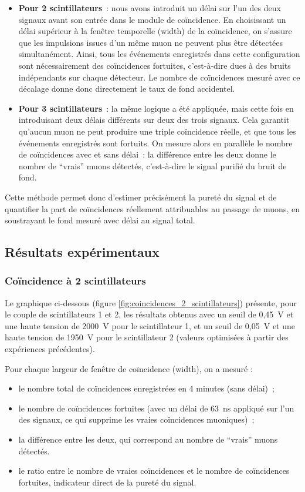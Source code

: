 \documentclass[a4paper,12pt,twoside]{article}
\begin{document}
\begin{itemize}
    \item \textbf{Pour 2 scintillateurs}~: nous avons introduit un délai sur l’un des deux signaux avant son entrée dans le module de coïncidence. En choisissant un délai supérieur à la fenêtre temporelle (width) de la coïncidence, on s’assure que les impulsions issues d’un même muon ne peuvent plus être détectées simultanément. Ainsi, tous les événements enregistrés dans cette configuration sont nécessairement des coïncidences fortuites, c’est-à-dire dues à des bruits indépendants sur chaque détecteur. Le nombre de coïncidences mesuré avec ce décalage donne donc directement le taux de fond accidentel.
    \item \textbf{Pour 3 scintillateurs}~: la même logique a été appliquée, mais cette fois en introduisant deux délais différents sur deux des trois signaux. Cela garantit qu’aucun muon ne peut produire une triple coïncidence réelle, et que tous les événements enregistrés sont fortuits. On mesure alors en parallèle le nombre de coïncidences avec et sans délai~: la différence entre les deux donne le nombre de “vrais” muons détectés, c’est-à-dire le signal purifié du bruit de fond.
\end{itemize}

Cette méthode permet donc d’estimer précisément la pureté du signal et de quantifier la part de coïncidences réellement attribuables au passage de muons, en soustrayant le fond mesuré avec délai au signal total.

\newpage

\subsection{Résultats expérimentaux}
\subsubsection{Coïncidence à 2 scintillateurs}

Le graphique ci-dessous (figure \ref{fig:coincidences_2_scintillateurs}) présente, pour le couple de scintillateurs 1 et 2, les résultats obtenus avec un seuil de 0{,}45~V et une haute tension de 2000~V pour le scintillateur 1, et un seuil de 0{,}05~V et une haute tension de 1950~V pour le scintillateur 2 (valeurs optimisées à partir des expériences précédentes).

Pour chaque largeur de fenêtre de coïncidence (width), on a mesuré :
\begin{itemize}
    \item le nombre total de coïncidences enregistrées en 4 minutes (sans délai)~;
    \item le nombre de coïncidences fortuites (avec un délai de 63~ns appliqué sur l’un des signaux, ce qui supprime les vraies coïncidences muoniques)~;
    \item la différence entre les deux, qui correspond au nombre de “vrais” muons détectés.
    \item le ratio entre le nombre de vraies coïncidences et le nombre de coïncidences fortuites, indicateur direct de la pureté du signal.
\end{itemize}
\end{document}
